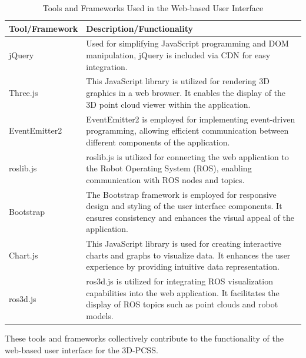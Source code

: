 \begin{table}[H]
	\centering
	\caption{Tools and Frameworks Used in the Web-based User Interface}
	\label{ch3:tab:tools-frameworks}
	\begin{tabular}{|l|p{9cm}|}
		\hline
		\textbf{Tool/Framework} & \textbf{Description/Functionality}                                                                                                                                                \\ \hline
		jQuery                  & Used for simplifying JavaScript programming and DOM manipulation, jQuery is included via CDN for easy integration.                                                                \\ \hline
		Three.js                & This JavaScript library is utilized for rendering 3D graphics in a web browser. It enables the display of the 3D point cloud viewer within the application.                       \\ \hline
		EventEmitter2           & EventEmitter2 is employed for implementing event-driven programming, allowing efficient communication between different components of the application.                            \\ \hline
		roslib.js               & roslib.js is utilized for connecting the web application to the Robot Operating System (ROS), enabling communication with ROS nodes and topics.                                   \\ \hline
		Bootstrap               & The Bootstrap framework is employed for responsive design and styling of the user interface components. It ensures consistency and enhances the visual appeal of the application. \\ \hline
		Chart.js                & This JavaScript library is used for creating interactive charts and graphs to visualize data. It enhances the user experience by providing intuitive data representation.         \\ \hline
		ros3d.js                & ros3d.js is utilized for integrating ROS visualization capabilities into the web application. It facilitates the display of ROS topics such as point clouds and robot models.     \\ \hline
	\end{tabular}
\end{table}


These tools and frameworks collectively contribute to the functionality of the web-based user interface for the 3D-PCSS.

